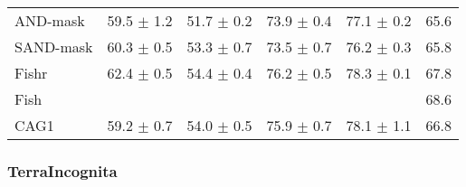 \documentclass{article}
\begin{document}
\begin{center}
{\begin{tabular}{lccccc}
AND-mask             & 59.5 $\pm$ 1.2       & 51.7 $\pm$ 0.2       & 73.9 $\pm$ 0.4       & 77.1 $\pm$ 0.2       & 65.6                 \\
SAND-mask            & 60.3 $\pm$ 0.5       & 53.3 $\pm$ 0.7       & 73.5 $\pm$ 0.7       & 76.2 $\pm$ 0.3       & 65.8                 \\
Fishr                & 62.4 $\pm$ 0.5       & 54.4 $\pm$ 0.4       & 76.2 $\pm$ 0.5       & 78.3 $\pm$ 0.1       & 67.8                 \\
Fish                 &                      &                      &                      &                      & 68.6                 \\
\midrule
CAG1                 & 59.2 $\pm$ 0.7       & 54.0 $\pm$ 0.5       & 75.9 $\pm$ 0.7       & 78.1 $\pm$ 1.1       & 66.8                 \\
\bottomrule
\end{tabular}}
\end{center}

\subsubsection{TerraIncognita}
\end{document}
